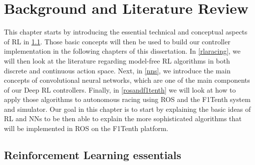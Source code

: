 
\chapter{Background and Literature Review} %

\label{Chapter2} %



This chapter starts by introducing the essential technical and conceptual aspects of RL in \ref{back}. Those basic concepts will then be used to build our controller implementation in the following chapters of this dissertation. In \ref{rlaracing}, we will then look at the literature regarding model-free RL algorithms in both discrete and continuous action space. Next, in \ref{nns}, we introduce the main concepts of convolutional neural networks, which are one of the main components of our Deep RL controllers. Finally, in \ref{rosandf1tenth} we will look at how to apply those algorithms to autonomous racing using ROS and the F1Tenth system and simulator. \newline
Our goal in this chapter is to start by explaining the basic ideas of RL and NNs to be then able to explain the more sophisticated algorithms that will be implemented in ROS on the F1Tenth platform. \newline

\section{Reinforcement Learning essentials}
\label{back}
